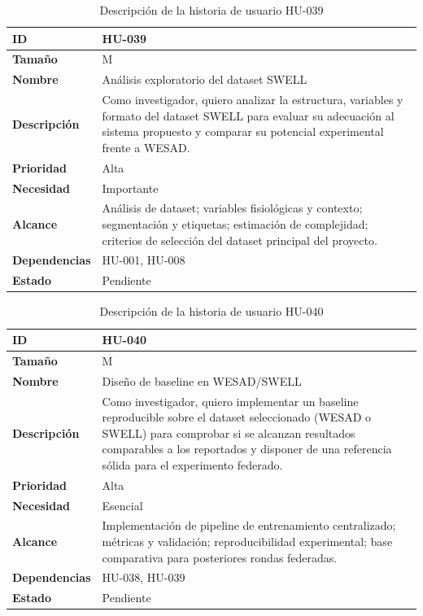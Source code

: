 \documentclass{report}
\begin{document}
\begin{table}[H]
\centering
\caption{Descripción de la historia de usuario HU-039}
\label{tab:hu039}
\begin{tabular}{|l|p{12cm}|}
\hline
\textbf{ID} & HU-039 \\ \hline
\textbf{Tamaño} & M \\ \hline
\textbf{Nombre} & Análisis exploratorio del dataset SWELL \\ \hline
\textbf{Descripción} &
Como investigador, quiero analizar la estructura, variables y formato del dataset SWELL para evaluar su adecuación al sistema propuesto y comparar su potencial experimental frente a WESAD. \\ \hline
\textbf{Prioridad} & Alta \\ \hline
\textbf{Necesidad} & Importante \\ \hline
\textbf{Alcance} &
Análisis de dataset; variables fisiológicas y contexto; segmentación y etiquetas; estimación de complejidad; criterios de selección del dataset principal del proyecto. \\ \hline
\textbf{Dependencias} & HU-001, HU-008 \\ \hline
\textbf{Estado} & Pendiente \\ \hline
\end{tabular}
\end{table}



\begin{table}[H]
\centering
\caption{Descripción de la historia de usuario HU-040}
\label{tab:hu040}
\begin{tabular}{|l|p{12cm}|}
\hline
\textbf{ID} & HU-040 \\ \hline
\textbf{Tamaño} & M \\ \hline
\textbf{Nombre} & Diseño de baseline en WESAD/SWELL \\ \hline
\textbf{Descripción} &
Como investigador, quiero implementar un baseline reproducible sobre el dataset seleccionado (WESAD o SWELL) para comprobar si se alcanzan resultados comparables a los reportados y disponer de una referencia sólida para el experimento federado. \\ \hline
\textbf{Prioridad} & Alta \\ \hline
\textbf{Necesidad} & Esencial \\ \hline
\textbf{Alcance} &
Implementación de pipeline de entrenamiento centralizado; métricas y validación; reproducibilidad experimental; base comparativa para posteriores rondas federadas. \\ \hline
\textbf{Dependencias} & HU-038, HU-039 \\ \hline
\textbf{Estado} & Pendiente \\ \hline
\end{tabular}
\end{table}
\end{document}
